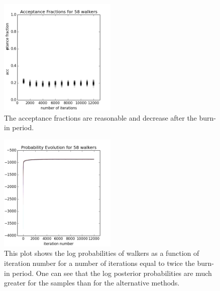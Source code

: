\documentclass[preprint]{aastex}
\begin{document}
\begin{figure}
\includegraphics[width=0.5\textwidth]{fracs-real.png}
\caption{The acceptance fractions are reasonable and decrease after the burn-in 
period.}
\label{fig:nullfrac}
\end{figure}

\begin{figure}
\includegraphics[width=0.5\textwidth]{probs-real.png}
\caption{This plot shows the log probabilities of walkers as a function of 
iteration number for a number of iterations equal to twice the burn-in period.  
One can see that the log posterior probabilities are much greater for the 
samples than for the alternative methods.}
\label{fig:nullprob}
\end{figure}
\end{document}

